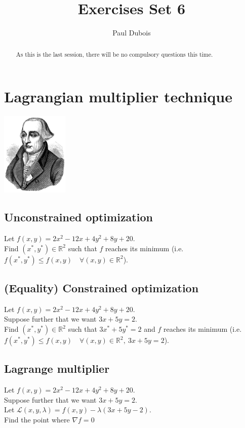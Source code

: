 \documentclass[]{article}
\title{Exercises Set 6}
\author{Paul Dubois}
\newcommand{\R}{\mathbb{R}}
\begin{document}
	
	\maketitle
	
	\begin{abstract}
		As this is the last session, there will be no compulsory questions this time.
	\end{abstract}	
	
	\section{Lagrangian multiplier technique}
	\begin{center}
		\includegraphics[height=4cm]{Lagrange}
	\end{center}

	\subsection{Unconstrained optimization}
	Let $f(x,y) = 2x^2-12x + 4y^2 + 8y + 20$.\\
	Find $(x^*,y^*) \in \R^2$ such that $f$ reaches its minimum (i.e. $f(x^*,y^*) \leq f(x,y) \quad \forall (x,y) \in \R^2$).
	
	\subsection{(Equality) Constrained optimization}
	Let $f(x,y) = 2x^2-12x + 4y^2 + 8y + 20$.\\
	Suppose further that we want $3x + 5y = 2$.\\
	Find $(x^*,y^*) \in \R^2$ such that $3x^* + 5y^* = 2$ and $f$ reaches its minimum (i.e. $f(x^*,y^*) \leq f(x,y) \quad \forall (x,y) \in \R^2,\ 3x + 5y = 2$).
	
	\subsection{Lagrange multiplier}
	Let $f(x,y) = 2x^2-12x + 4y^2 + 8y + 20$.\\
	Suppose further that we want $3x + 5y = 2$.\\
	Let $\mathcal{L}(x,y,\lambda) = f(x,y) - \lambda (3x + 5y -2)$.\\
	Find the point where $\nabla f = 0$
	
\end{document}
